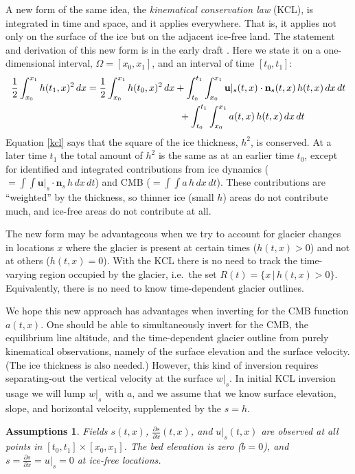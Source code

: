 \documentclass[letterpaper,final,12pt,reqno]{amsart}
\newtheorem*{assumptions}{Assumptions}
\newcommand{\bn}{\mathbf{n}}
\newcommand{\bu}{\mathbf{u}}
\begin{document}
A new form of the same idea, the \emph{kinematical conservation law} (KCL), is integrated in time and space, and it applies everywhere.  That is, it applies not only on the surface of the ice but on the adjacent ice-free land.  The statement and derivation of this new form is in the early draft \cite{Bueler2022}.  Here we state it on a one-dimensional interval, $\Omega=[x_0,x_1]$, and an interval of time $[t_0,t_1]$:
\begin{align}
\frac{1}{2} \int_{x_0}^{x_1} h(t_1,x)^2\,dx &= \frac{1}{2} \int_{x_0}^{x_1} h(t_0,x)^2\,dx + \int_{t_0}^{t_1} \int_{x_0}^{x_1} \bu|_s(t,x)\cdot \bn_s(t,x)\,h(t,x) \,dx\,dt \label{kcl} \\
  &\hspace{34mm} + \int_{t_0}^{t_1} \int_{x_0}^{x_1} a(t,x)\,h(t,x) \,dx\,dt \notag
\end{align}
Equation \eqref{kcl} says that the square of the ice thickness, $h^2$, is conserved.  At a later time $t_1$ the total amount of $h^2$ is the same as at an earlier time $t_0$, except for identified and integrated contributions from ice dynamics ($=\int \int \bu|_s \cdot \bn_s\,h \,dx\,dt$) and CMB ($=\int \int a\,h \,dx\,dt$).  These contributions are ``weighted'' by the thickness, so thinner ice (small $h$) areas do not contribute much, and ice-free areas do not contribute at all.

The new form may be advantageous when we try to account for glacier changes in locations $x$ where the glacier is present at certain times ($h(t,x)>0$) and not at others ($h(t,x)=0$).  With the KCL there is no need to track the time-varying region occupied by the glacier, i.e.~the set $R(t) = \{x\,|\,h(t,x)>0\}$.  Equivalently, there is no need to know time-dependent glacier outlines.

We hope this new approach has advantages when inverting for the CMB function $a(t,x)$.  One should be able to simultaneously invert for the CMB, the equilibrium line altitude, and the time-dependent glacier outline from purely kinematical observations, namely of the surface elevation and the surface velocity.  (The ice thickness is also needed.)  However, this kind of inversion requires separating-out the vertical velocity at the surface $w|_s$.  In initial KCL inversion usage we will lump $w|_s$ with $a$, and we assume that we know surface elevation, slope, and horizontal velocity, supplemented by the $s=h$.

\begin{assumptions}  Fields $s(t,x)$, $\frac{\partial s}{\partial x}(t,x)$, and $u|_s(t,x)$ are observed at all points in $[t_0,t_1] \times [x_0,x_1]$.  The bed elevation is zero ($b=0$), and $s = \frac{\partial s}{\partial x} = u|_s =0$ at ice-free locations. \end{assumptions}
\end{document}
